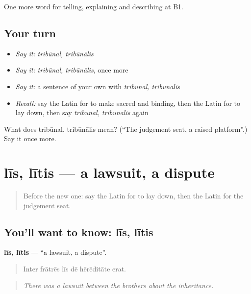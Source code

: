 \begin{grammarlens}[title={What you've built}]
One more word for telling, explaining and describing at B1.
\end{grammarlens}

\subsection*{Your turn}
\begin{itemize}
\raggedright
  \item \emph{Say it:} \emph{tribūnal, tribūnālis}
  \item \emph{Say it:} \emph{tribūnal, tribūnālis}, once more
  \item \emph{Say it:} a sentence of your own with \emph{tribūnal, tribūnālis}
  \item \emph{Recall:} say the Latin for to make sacred and binding, then the Latin for to lay down, then say \emph{tribūnal, tribūnālis} again
\end{itemize}

\begin{tcolorbox}[breakable,colback=teal!4,colframe=teal!35!black,title={Before you move on}]
What does tribūnal, tribūnālis mean? (\textquotedblleft{}The judgement seat, a raised platform\textquotedblright{}.) Say it once more.
\end{tcolorbox}
\section[līs, lītis]{līs, lītis — a lawsuit, a dispute}

\label{lesson:LA-C411-lis}



\begin{quote}
Before the new one: say the Latin for to lay down, then the Latin for the judgement seat.
\end{quote}

\subsection*{You'll want to know: līs, lītis}
\textbf{līs, lītis} — \textquotedblleft{}a lawsuit, a dispute\textquotedblright{}.

\begin{quote}
Inter frātrēs līs dē hērēditāte erat.
\end{quote}

\begin{quote}
\emph{There was a lawsuit between the brothers about the inheritance.}
\end{quote}


